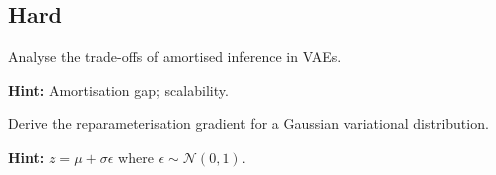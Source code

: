 \subsection*{Hard}

\begin{problem}
Analyse the trade-offs of amortised inference in VAEs.

\textbf{Hint:} Amortisation gap; scalability.
\end{problem}

\begin{problem}
Derive the reparameterisation gradient for a Gaussian variational distribution.

\textbf{Hint:} $z = \mu + \sigma \epsilon$ where $\epsilon \sim \mathcal{N}(0,1)$.
\end{problem}

